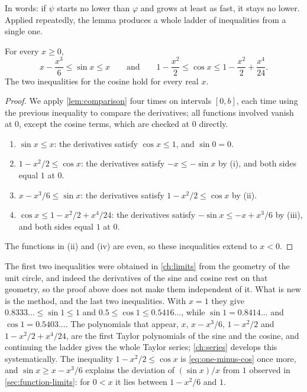 In words: if $\psi$ starts no lower than $\varphi$ and grows at least as fast, it stays no lower. Applied repeatedly, the lemma produces a whole ladder of inequalities from a single one.

\begin{proposition}
\label{prop:sin-cos-ladder}
For every $x\ge0$,
\[
x-\frac{x^3}6\le\sin x\le x\qquad\text{and}\qquad1-\frac{x^2}2\le\cos x\le1-\frac{x^2}2+\frac{x^4}{24}.
\]
The two inequalities for the cosine hold for every real $x$.
\end{proposition}

\begin{proof}
We apply \cref{lem:comparison} four times on intervals $[0,b]$, each time using the previous inequality to compare the derivatives; all functions involved vanish at $0$, except the cosine terms, which are checked at $0$ directly.
\begin{enumerate}
\item $\sin x\le x$: the derivatives satisfy $\cos x\le1$, and $\sin0=0$.
\item $1-x^2/2\le\cos x$: the derivatives satisfy $-x\le-\sin x$ by (i), and both sides equal $1$ at $0$.
\item $x-x^3/6\le\sin x$: the derivatives satisfy $1-x^2/2\le\cos x$ by (ii).
\item $\cos x\le1-x^2/2+x^4/24$: the derivatives satisfy $-\sin x\le-x+x^3/6$ by (iii), and both sides equal $1$ at $0$.
\end{enumerate}
The functions in (ii) and (iv) are even, so these inequalities extend to $x<0$.
\end{proof}

The first two inequalities were obtained in \cref{ch:limits} from the geometry of the unit circle, and indeed the derivatives of the sine and cosine rest on that geometry, so the proof above does not make them independent of it. What is new is the method, and the last two inequalities. With $x=1$ they give $0.8333\ldots\le\sin1\le1$ and $0.5\le\cos1\le0.5416\ldots$, while $\sin1=0.8414\ldots$ and $\cos1=0.5403\ldots$. The polynomials that appear, $x$, $x-x^3/6$, $1-x^2/2$ and $1-x^2/2+x^4/24$, are the first Taylor polynomials of the sine and the cosine, and continuing the ladder gives the whole Taylor series; \cref{ch:series} develops this systematically. The inequality $1-x^2/2\le\cos x$ is \eqref{eq:one-minus-cos} once more, and $\sin x\ge x-x^3/6$ explains the deviation of $(\sin x)/x$ from $1$ observed in \cref{sec:function-limits}: for $0<x$ it lies between $1-x^2/6$ and $1$.

